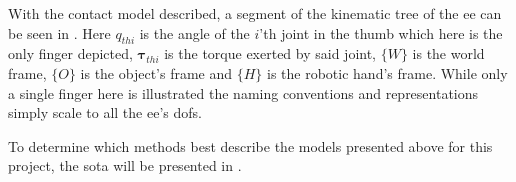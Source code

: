 With the contact model described, a segment of the kinematic tree of the \gls{ee} can be seen in . Here $q_{thi}$ is the angle of the $i$'th joint in the thumb which here is the only finger depicted, $\boldsymbol{\tau}_{thi}$ is the torque exerted by said joint, $\{W\}$ is the world frame, $\{O\}$ is the object's frame and $\{H\}$ is the robotic hand's frame. While only a single finger here is illustrated the naming conventions and representations simply scale to all the \gls{ee}'s \gls{dof}s.


To determine which methods best describe the models presented above for this project, the \gls{sota} will be presented in .